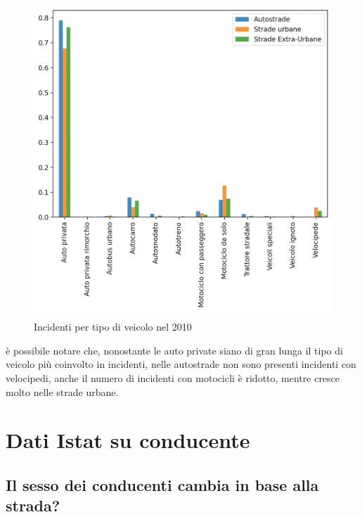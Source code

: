 \documentclass[a4paper]{report}
\begin{document}
\begin{figure}
    \includegraphics[width=\linewidth]{../src/incidenti/incidenti_senza_coords/tipo_veicoli/differenza_strade.png}
    \caption{Incidenti per tipo di veicolo nel 2010}
    \label{fig:differenza_strade}
\end{figure}


è possibile notare che, nonostante le auto private siano di gran lunga il tipo di veicolo 
più coinvolto in incidenti, nelle autostrade non sono presenti incidenti con velocipedi, 
anche il numero di incidenti con motocicli è ridotto, mentre cresce molto nelle strade urbane.


\section{Dati Istat su conducente}

\subsection{Il sesso dei conducenti cambia in base alla strada?}
\end{document}
